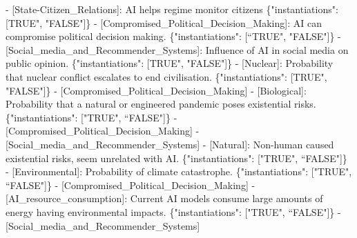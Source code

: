 \documentclass[
  11pt,
  letterpaper,
  openany]{book}
\newenvironment{Shaded}{\begin{snugshade}}{\end{snugshade}}
\newcommand{\DataTypeTok}[1]{\textcolor[rgb]{0.68,0.00,0.00}{#1}}
\newcommand{\ErrorTok}[1]{\textcolor[rgb]{0.68,0.00,0.00}{#1}}
\newcommand{\FunctionTok}[1]{\textcolor[rgb]{0.28,0.35,0.67}{#1}}
\newcommand{\OtherTok}[1]{\textcolor[rgb]{0.00,0.23,0.31}{#1}}
\newcommand{\StringTok}[1]{\textcolor[rgb]{0.13,0.47,0.30}{#1}}
\begin{document}
\begin{Shaded}
\begin{Highlighting}[]
    \ErrorTok{{-}} \OtherTok{[}\ErrorTok{State{-}Citizen\_Relations}\OtherTok{]}\ErrorTok{:} \ErrorTok{AI} \ErrorTok{helps} \ErrorTok{regime} \ErrorTok{monitor} \ErrorTok{citizens} \FunctionTok{\{}\DataTypeTok{"instantiations"}\FunctionTok{:} \OtherTok{[}\ErrorTok{TRUE}\StringTok{", "}\ErrorTok{FALSE}\StringTok{"]\}}
\StringTok{  {-} [Compromised\_Political\_Decision\_Making]: AI can compromise political decision making. \{"}\ErrorTok{instantiations}\StringTok{": [“TRUE"}\OtherTok{,} \StringTok{"FALSE"}\OtherTok{]}\FunctionTok{\}}
    \ErrorTok{{-}} \OtherTok{[}\ErrorTok{Social\_media\_and\_Recommender\_Systems}\OtherTok{]}\ErrorTok{:} \ErrorTok{Influence} \ErrorTok{of} \ErrorTok{AI} \ErrorTok{in} \ErrorTok{social} \ErrorTok{media} \ErrorTok{on} \ErrorTok{public} \ErrorTok{opinion.} \FunctionTok{\{}\DataTypeTok{"instantiations"}\FunctionTok{:} \OtherTok{[}\ErrorTok{TRUE}\StringTok{", "}\ErrorTok{FALSE}\StringTok{"]\}}
\StringTok{{-} [Nuclear]: Probability that nuclear conflict escalates to end civilisation. \{"}\ErrorTok{instantiations}\StringTok{": [TRUE"}\OtherTok{,} \StringTok{"FALSE"}\OtherTok{]}\FunctionTok{\}}
  \ErrorTok{{-}} \OtherTok{[}\ErrorTok{Compromised\_Political\_Decision\_Making}\OtherTok{]}
\ErrorTok{{-}} \OtherTok{[}\ErrorTok{Biological}\OtherTok{]}\ErrorTok{:} \ErrorTok{Probability} \ErrorTok{that} \ErrorTok{a} \ErrorTok{natural} \ErrorTok{or} \ErrorTok{engineered} \ErrorTok{pandemic} \ErrorTok{poses} \ErrorTok{existential} \ErrorTok{risks.} \FunctionTok{\{}\DataTypeTok{"instantiations"}\FunctionTok{:} \OtherTok{[}\StringTok{"TRUE"}\OtherTok{,} \ErrorTok{“FALSE}\StringTok{"]\}}
\StringTok{  {-} [Compromised\_Political\_Decision\_Making]}
\StringTok{  {-} [Social\_media\_and\_Recommender\_Systems]}
\StringTok{{-} [Natural]: Non{-}human caused existential risks, seem unrelated with AI. \{"}\ErrorTok{instantiations}\StringTok{": ["}\ErrorTok{TRUE}\StringTok{", “FALSE"}\OtherTok{]}\FunctionTok{\}}
\ErrorTok{{-}} \OtherTok{[}\ErrorTok{Environmental}\OtherTok{]}\ErrorTok{:} \ErrorTok{Probability} \ErrorTok{of} \ErrorTok{climate} \ErrorTok{catastrophe.} \FunctionTok{\{}\DataTypeTok{"instantiations"}\FunctionTok{:} \OtherTok{[}\StringTok{"TRUE"}\OtherTok{,} \ErrorTok{“FALSE}\StringTok{"]\}}
\StringTok{  {-} [Compromised\_Political\_Decision\_Making]}
\StringTok{  {-} [AI\_resource\_consumption]: Current AI models consume large amounts of energy having environmental impacts. \{"}\ErrorTok{instantiations}\StringTok{": ["}\ErrorTok{TRUE}\StringTok{", “FALSE"}\OtherTok{]}\FunctionTok{\}}
  \ErrorTok{{-}} \OtherTok{[}\ErrorTok{Social\_media\_and\_Recommender\_Systems}\OtherTok{]}
\end{Highlighting}
\end{Shaded}
\end{document}
